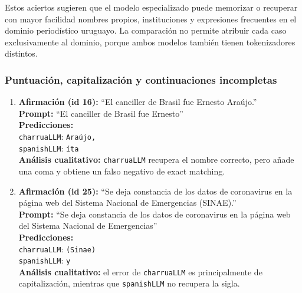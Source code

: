 \documentclass[11pt,a4paper]{article}
\newcommand{\charrua}{\texttt{charruaLLM}}
\newcommand{\spanishmodel}{\texttt{spanishLLM}}
\newcommand{\code}[1]{\texttt{#1}}
\begin{document}
Estos aciertos sugieren que el modelo especializado puede memorizar o recuperar
con mayor facilidad nombres propios, instituciones y expresiones frecuentes en
el dominio periodístico uruguayo. La comparación no permite atribuir cada caso
exclusivamente al dominio, porque ambos modelos también tienen tokenizadores
distintos.

\subsubsection{Puntuación, capitalización y continuaciones incompletas}

\begin{enumerate}[leftmargin=*, itemsep=0.9em]
    \item \textbf{Afirmación (id 16):} ``El canciller de Brasil fue Ernesto
          Araújo.''\\
          \textbf{Prompt:} ``El canciller de Brasil fue Ernesto''\\
          \textbf{Predicciones:}\\
          \hspace*{1em}\charrua{}: \code{Araújo,}\\
          \hspace*{1em}\spanishmodel{}: \code{íta}\\
          \textbf{Análisis cualitativo:} \charrua{} recupera el nombre correcto,
          pero añade una coma y obtiene un falso negativo de exact matching.

    \item \textbf{Afirmación (id 25):} ``Se deja constancia de los datos de
          coronavirus en la página web del Sistema Nacional de Emergencias
          (SINAE).''\\
          \textbf{Prompt:} ``Se deja constancia de los datos de coronavirus en la
          página web del Sistema Nacional de Emergencias''\\
          \textbf{Predicciones:}\\
          \hspace*{1em}\charrua{}: \code{(Sinae)}\\
          \hspace*{1em}\spanishmodel{}: \code{y}\\
          \textbf{Análisis cualitativo:} el error de \charrua{} es principalmente
          de capitalización, mientras que \spanishmodel{} no recupera la sigla.


\end{enumerate}
\end{document}
